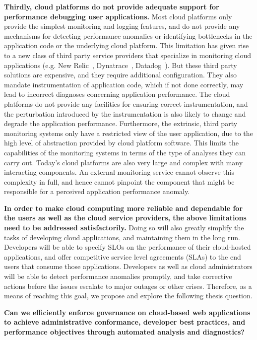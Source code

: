 \textbf{Thirdly, cloud platforms do not provide adequate support for performance debugging
user applications.} Most cloud platforms only provide the simplest monitoring and logging features,
and do not provide any mechanisms for detecting performance anomalies or identifying
bottlenecks in the application code or the underlying cloud platform. This limitation has given rise
to a new class of third party service providers that specialize in monitoring cloud applications
(e.g. New Relic~\cite{newrelic}, Dynatrace~\cite{dynatrace}, Datadog~\cite{datadog}). But these 
third party solutions are expensive, and they require additional configuration. 
They also mandate instrumentation of application code, which if not done
correctly, may lead to incorrect diagnoses concerning application performance. The cloud
platforms do not provide any facilities for ensuring correct instrumentation, and the perturbation
introduced by the instrumentation is also likely to change and degrade the application performance.
Furthermore, the extrinsic, third party monitoring systems only have a restricted view 
of the user application, due to the high level of abstraction provided by cloud platform software.
This limits the capabilities of the monitoring systems in terms of the type of analyses they can carry out.
Today's cloud platforms are also very large and complex with many interacting components.
An external monitoring service cannot observe this complexity in full, and hence cannot pinpoint
the component that might be responsible for a perceived application performance anomaly.

\textbf{In order to make cloud computing more reliable and dependable for the users as well
as the cloud service providers, the above limitations need to be addressed satisfactorily.}
Doing so will also greatly simplify the tasks of developing cloud applications, and maintaining 
them in the long run. Developers will be able to specify SLOs on the performance of
their cloud-hosted applications, and offer competitive service level agreements (SLAs) to the end users that consume those
applications. Developers as well as cloud administrators will be able to detect performance anomalies
promptly, and take corrective actions before the issues escalate to major
outages or other crises. Therefore, as a means of reaching this goal, we propose and explore the
following thesis question.

{\bf Can we efficiently enforce governance on cloud-based web applications to achieve 
administrative conformance, developer best practices, and performance objectives through 
automated analysis and diagnostics?} 

